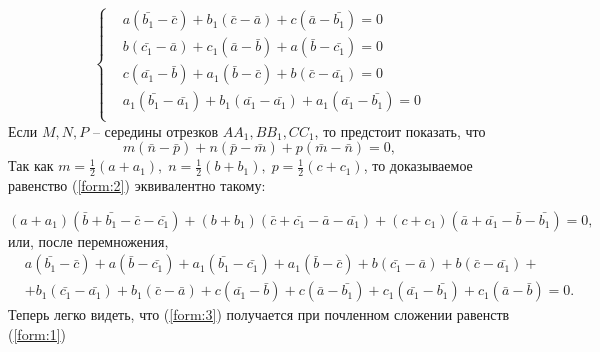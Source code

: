 \begin{equation}
    \left\{ \begin{aligned}
         & a(\bar{b_1} - \bar{c}) + b_1(\bar{c} - \bar{a}) + c(\bar{a} - \bar{b_1}) = 0             \\
         & b(\bar{c_1} - \bar{a}) + c_1(\bar{a} - \bar{b}) + a(\bar{b} - \bar{c_1}) = 0             \\
         & c(\bar{a_1} - \bar{b}) + a_1(\bar{b} - \bar{c}) + b(\bar{c} - \bar{a_1}) = 0             \\
         & a_1(\bar{b_1} - \bar{a_1}) + b_1(\bar{a_1} - \bar{a_1}) + a_1(\bar{a_1} - \bar{b_1}) = 0 \\
    \end{aligned}
    \right. \label{form:1}
\end{equation}
Если \(M, N, P\) -- середины отрезков \(AA_1, BB_1, CC_1\), то предстоит показать, что
\begin{equation}
    m(\bar{n} -\bar{p})+n(\bar{p}-\bar{m})+p(\bar{m}-\bar{n})=0,
    \label{form:2}
\end{equation}
Так как \(\displaystyle
m=\frac{1}{2}(a+a_1),\;
n=\frac{1}{2}(b+b_1),\;
p=\frac{1}{2}(c+c_1)
\), то доказываемое равенство (\ref{form:2}) эквивалентно такому:

\(
(a+a_1)(\bar{b}+\bar{b_1}-\bar{c}-\bar{c_1})+(b+b_1 )(\bar{c}+\bar{c_1}-\bar{a}-\bar{a_1})+(c+c_1)(\bar{a}+\bar{a_1}-\bar{b}-\bar{b_1})=0,
\) или, после перемножения,
\begin{equation}
    \begin{aligned}
         & a(\bar{b_1} - \bar{c}) + a(\bar{b}- \bar{c_1}) + a_1(\bar{b_1} - \bar{c_1}) + a_1(\bar{b}- \bar{c}) + b(\bar{c_1} - \bar{a}) + b(\bar{c}- \bar{a_1}) + \\
         & +b_1(\bar{c_1}-\bar{a_1})+b_1 (\bar{c}-\bar{a})+c(\bar{a_1}-\bar{b})+c(\bar{a}-\bar{b_1})+c_1 (\bar{a_1}-\bar{b_1} )+c_1(\bar{a}-\bar{b})=0.
    \end{aligned}
    \label{form:3}
\end{equation}
Теперь легко видеть, что (\ref{form:3}) получается при почленном сложении
равенств (\ref{form:1})
